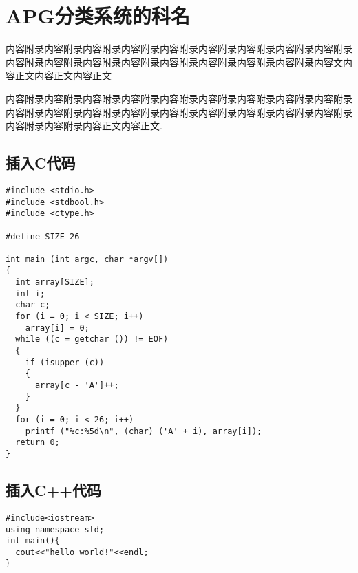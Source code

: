 \documentclass[utf8]{book}
\begin{document}
	
	
	\appendix
	
	\chapter{APG分类系统的科名}
	
	内容附录内容附录内容附录内容附录内容附录内容附录内容附录内容附录内容附录内容附录内容附录内容附录内容附录内容附录内容附录内容附录内容附录内容文内容正文内容正文内容正文
	
	内容附录内容附录内容附录内容附录内容附录内容附录内容附录内容附录内容附录内容附录内容附录内容附录内容附录内容附录内容附录内容附录内容附录内容附录内容附录内容附录内容正文内容正文\cite{DK1}.
		\section{插入C代码}
	\lstset{language=C}
	\begin{lstlisting}
#include <stdio.h>
#include <stdbool.h>
#include <ctype.h>

#define SIZE 26

int main (int argc, char *argv[])
{
  int array[SIZE];
  int i;
  char c;
  for (i = 0; i < SIZE; i++)
    array[i] = 0;
  while ((c = getchar ()) != EOF)
  {
    if (isupper (c))
    {
      array[c - 'A']++;
    }
  }
  for (i = 0; i < 26; i++)
    printf ("%c:%5d\n", (char) ('A' + i), array[i]);
  return 0;
}
	\end{lstlisting}	
	\section{插入C++代码}
	\lstset{language=C++}   
	\begin{lstlisting}
#include<iostream>
using namespace std;
int main(){
  cout<<"hello world!"<<endl;
}
	\end{lstlisting}
	
\end{document}
